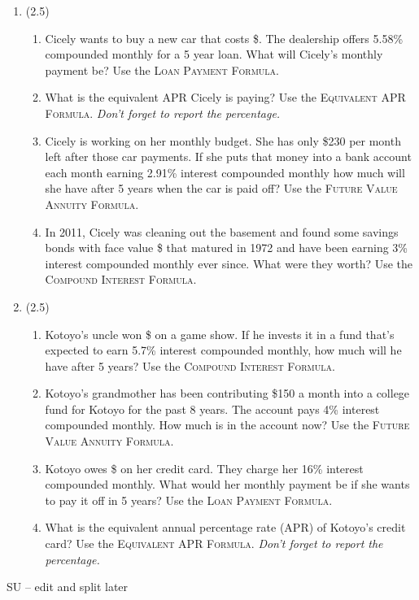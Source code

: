 \documentclass[12pt]{article}
\begin{document}
\begin{enumerate}
 \item (2.5)   \begin{enumerate} 
\item Cicely wants to buy a new car that costs \$.  The dealership offers 5.58\% compounded monthly for a 5 year loan.  What will Cicely's monthly payment be? Use the \textsc{Loan Payment Formula}.  
\item What is the equivalent APR Cicely  is paying?  Use the \textsc{Equivalent APR Formula}.   \emph{Don't forget to report the percentage.}
\item Cicely is working on her monthly budget.  She has only \$230 per month left after those car payments.  If she puts that money into a bank account each month earning 2.91\% interest compounded monthly how much will she have after 5 years when the car is paid off?  Use the \textsc{Future Value Annuity Formula}.   
\item In 2011, Cicely was cleaning out the basement and found some savings bonds with face value \$ that matured in 1972 and have been earning 3\% interest compounded monthly ever since.  What were they worth? Use the \textsc{Compound Interest Formula}.  
\end{enumerate}
 
 \item  (2.5)  \begin{enumerate} 
\item Kotoyo's uncle won \$ on a game show.  If he invests it in a fund that's expected to earn 5.7\% interest compounded monthly, how much will he have after 5 years? Use the \textsc{Compound Interest Formula}. 
\item Kotoyo's grandmother has been contributing \$150 a month into a college fund for Kotoyo for the past 8 years.  The account pays 4\% interest compounded monthly.  How much is in the account now? Use the \textsc{Future Value Annuity Formula}.   
\item Kotoyo owes \$ on her credit card.  They charge her 16\% interest compounded monthly.  What would her monthly payment be if she wants to pay it off in 5 years? Use the \textsc{Loan Payment Formula}.  
\item What is the equivalent annual percentage rate (APR) of Kotoyo's credit card? Use the \textsc{Equivalent APR Formula}.  \emph{Don't forget to report the percentage.}
\end{enumerate}


\end{enumerate}

SU -- edit and split later
\end{document}
